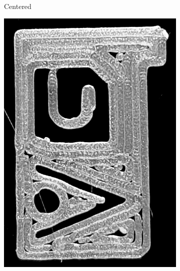 \begin{figure}
\begin{subfigure}{\figwidth}
\caption{Centered}\label{print_center}
\end{subfigure}
\begin{subfigure}{\figwidth}\centering
\includegraphics[height=\figheightTwo]{sources/applications/gMAT_inward.png}

\end{subfigure}
\end{figure}
